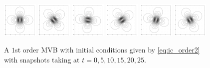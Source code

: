 \documentclass[12pt]{amsart}
\theoremstyle{remark}
\begin{document}
\begin{figure}[h!]
	\centering
	\includegraphics[width = 0.15\textwidth]{./images/singleton_order2/order_2_time_0}
	\includegraphics[width = 0.15\textwidth]{./images/singleton_order2/order_2_time_5}
	\includegraphics[width = 0.15\textwidth]{./images/singleton_order2/order_2_time_10}
	\includegraphics[width = 0.15\textwidth]{./images/singleton_order2/order_2_time_15}
	\includegraphics[width = 0.15\textwidth]{./images/singleton_order2/order_2_time_20}
	\includegraphics[width = 0.15\textwidth]{./images/singleton_order2/order_2_time_25}
	\caption{A $1$st order MVB with initial conditions given by \eqref{eq:ic_order2}
		with snapshots taking at $t=0,5,10,15,20,25$.}
	\label{fig:singleton_order2}
\end{figure}
\end{document}
